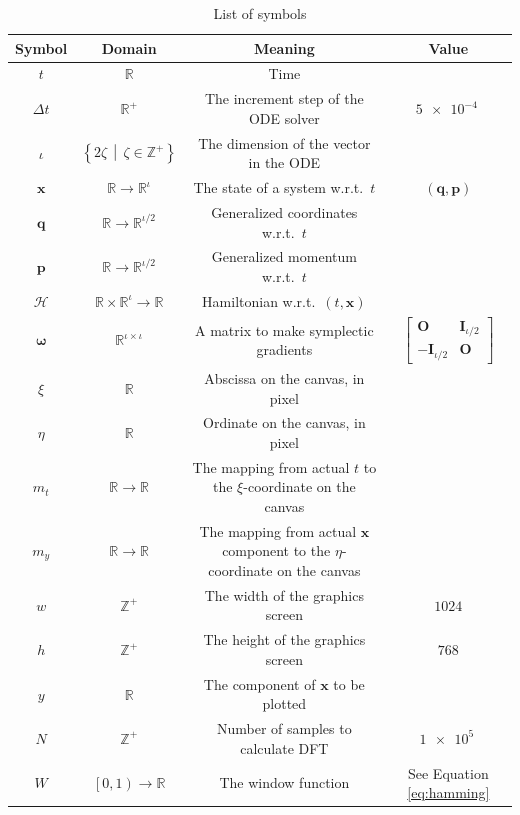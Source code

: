 \documentclass[12pt]{article}
\begin{document}
\begin{table}[h]
  \caption{List of symbols}
  \label{tab:symbols}
  \centering
  \begin{tabular}{cccc}
    Symbol & Domain & Meaning & Value\\
    \hline
    $t$ & $\mathbb R$ & Time\\
    $\Delta t$ & $\mathbb R^+$ & The increment step of the ODE solver & $\SI{5e-4}{}$\\
    $\iota$ & $\left\{2\zeta\,\middle|\,\zeta\in\mathbb Z^+\right\}$ & The dimension of the vector in the ODE\\
    $\mathbf x$ & $\mathbb R\rightarrow\mathbb R^\iota$ & The state of a system w.r.t.\ $t$ & $\left(\mathbf q,\mathbf p\right)$\\
    $\mathbf q$ & $\mathbb R\rightarrow\mathbb R^{\iota/2}$ & Generalized coordinates w.r.t.\ $t$\\
    $\mathbf p$ & $\mathbb R\rightarrow\mathbb R^{\iota/2}$ & Generalized momentum w.r.t.\ $t$\\
    $\mathcal H$ & $\mathbb R\times\mathbb R^\iota\rightarrow\mathbb R$ & Hamiltonian w.r.t.\ $\left(t,\mathbf x\right)$\\
    $\boldsymbol\omega$ & $\mathbb R^{\iota\times\iota}$ & A matrix to make symplectic gradients & $\left[\begin{matrix}
      \mathbf O & \mathbf I_{\iota/2}\\
      -\mathbf I_{\iota/2} & \mathbf O
    \end{matrix}\right]$\\
    $\xi$ & $\mathbb R$ & Abscissa on the canvas, in pixel\\
    $\eta$ & $\mathbb R$ & Ordinate on the canvas, in pixel\\
    $m_t$ & $\mathbb R\rightarrow\mathbb R$ & \makecell{The mapping from actual $t$\\to the $\xi$-coordinate on the canvas}\\
    $m_y$ & $\mathbb R\rightarrow\mathbb R$ & \makecell{The mapping from actual $\mathbf x$ component\\to the $\eta$-coordinate on the canvas}\\
    $w$ & $\mathbb Z^+$ & The width of the graphics screen & $1024$\\
    $h$ & $\mathbb Z^+$ & The height of the graphics screen & $768$\\
    $y$ & $\mathbb R$ & The component of $\mathbf x$ to be plotted\\
    $N$ & $\mathbb Z^+$ & Number of samples to calculate DFT & $\SI{1e5}{}$\\
    $W$ & $\left[0,1\right)\rightarrow\mathbb R$ & The window function & See Equation \ref{eq:hamming}
  \end{tabular}
\end{table}
\end{document}
